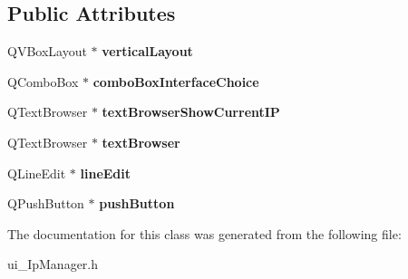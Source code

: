 \subsection*{Public Attributes}
\begin{DoxyCompactItemize}
\item 
\hypertarget{class_ui___change_ip_a2bf272634bccc489021fb240f03c702f}{Q\-V\-Box\-Layout $\ast$ {\bfseries vertical\-Layout}}\label{class_ui___change_ip_a2bf272634bccc489021fb240f03c702f}

\item 
\hypertarget{class_ui___change_ip_a8c51c8173fcd2154d80ede72e4cba592}{Q\-Combo\-Box $\ast$ {\bfseries combo\-Box\-Interface\-Choice}}\label{class_ui___change_ip_a8c51c8173fcd2154d80ede72e4cba592}

\item 
\hypertarget{class_ui___change_ip_afcaf8538561c94318c8ac4a99b4434b0}{Q\-Text\-Browser $\ast$ {\bfseries text\-Browser\-Show\-Current\-I\-P}}\label{class_ui___change_ip_afcaf8538561c94318c8ac4a99b4434b0}

\item 
\hypertarget{class_ui___change_ip_a2940b38044baf08b34e536f7ae6f93f9}{Q\-Text\-Browser $\ast$ {\bfseries text\-Browser}}\label{class_ui___change_ip_a2940b38044baf08b34e536f7ae6f93f9}

\item 
\hypertarget{class_ui___change_ip_a2c201f7544442c60073287e0bd97ddbf}{Q\-Line\-Edit $\ast$ {\bfseries line\-Edit}}\label{class_ui___change_ip_a2c201f7544442c60073287e0bd97ddbf}

\item 
\hypertarget{class_ui___change_ip_a22e3719296b51c2f6d8248458f4ab1f6}{Q\-Push\-Button $\ast$ {\bfseries push\-Button}}\label{class_ui___change_ip_a22e3719296b51c2f6d8248458f4ab1f6}

\end{DoxyCompactItemize}


The documentation for this class was generated from the following file\-:\begin{DoxyCompactItemize}
\item 
ui\-\_\-\-Ip\-Manager.\-h\end{DoxyCompactItemize}
